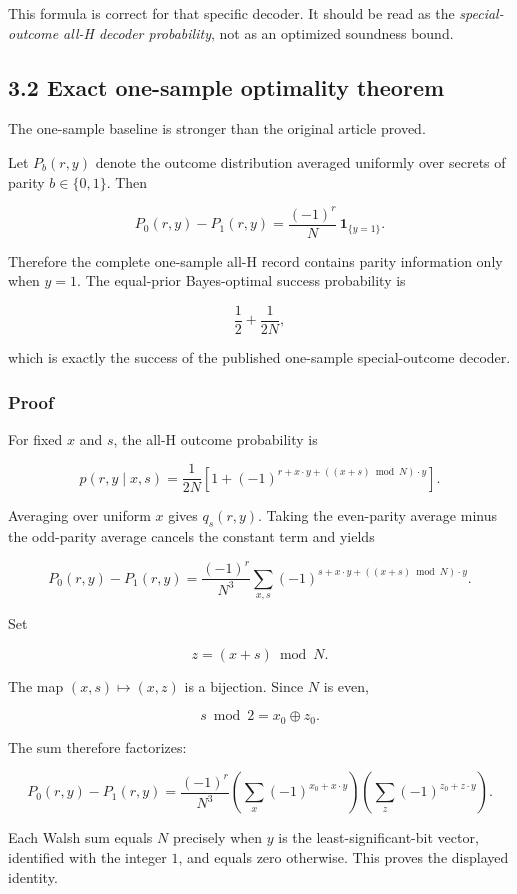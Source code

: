 \documentclass[
  10pt,
]{article}
\begin{document}
This formula is correct for that specific decoder. It should be read as
the \emph{special-outcome all-H decoder probability}, not as an
optimized soundness bound.

\subsection{3.2 Exact one-sample optimality
theorem}\label{exact-one-sample-optimality-theorem}

The one-sample baseline is stronger than the original article proved.

Let \(P_b(r,y)\) denote the outcome distribution averaged uniformly over
secrets of parity \(b\in\{0,1\}\). Then

\[
\boxed{
P_0(r,y)-P_1(r,y)
=
\frac{(-1)^r}{N}\,\mathbf{1}_{\{y=1\}}.
}
\]

Therefore the complete one-sample all-H record contains parity
information only when \(y=1\). The equal-prior Bayes-optimal success
probability is

\[
\boxed{
\frac12+\frac1{2N},
}
\]

which is exactly the success of the published one-sample special-outcome
decoder.

\subsubsection{Proof}\label{proof}

For fixed \(x\) and \(s\), the all-H outcome probability is

\[
p(r,y\mid x,s)
=
\frac1{2N}
\left[
1+(-1)^{r+x\cdot y+((x+s)\bmod N)\cdot y}
\right].
\]

Averaging over uniform \(x\) gives \(q_s(r,y)\). Taking the even-parity
average minus the odd-parity average cancels the constant term and
yields

\[
P_0(r,y)-P_1(r,y)
=
\frac{(-1)^r}{N^3}
\sum_{x,s}
(-1)^{s+x\cdot y+((x+s)\bmod N)\cdot y}.
\]

Set

\[
z=(x+s)\bmod N.
\]

The map \((x,s)\mapsto(x,z)\) is a bijection. Since \(N\) is even,

\[
s\bmod2=x_0\oplus z_0.
\]

The sum therefore factorizes:

\[
P_0(r,y)-P_1(r,y)
=
\frac{(-1)^r}{N^3}
\left(\sum_x(-1)^{x_0+x\cdot y}\right)
\left(\sum_z(-1)^{z_0+z\cdot y}\right).
\]

Each Walsh sum equals \(N\) precisely when \(y\) is the
least-significant-bit vector, identified with the integer \(1\), and
equals zero otherwise. This proves the displayed identity.
\end{document}
